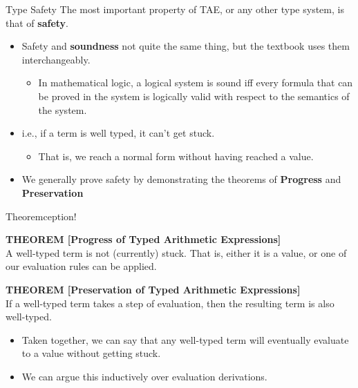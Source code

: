 \documentclass[11pt]{beamer}
\begin{document}
\begin{frame}[fragile=singleslide]{Type Safety}
The most important property of TAE, or any other type system, is that of \textbf{safety}.
\begin{itemize}
\item Safety and \textbf{soundness} not quite the same thing, but the textbook uses them interchangeably.  
\begin{itemize}
 \item In mathematical logic, a logical system is sound iff every formula that can be proved in the system is logically valid with respect to the semantics of the system.  
 \end{itemize} 
\item i.e., if a term is well typed, it can't get stuck. 
\begin{itemize}
\item That is, we reach a normal form without having reached a value.  
\end{itemize}
\item We generally prove safety by demonstrating the theorems of \textbf{Progress} and \textbf{Preservation}
\end{itemize}  

\end{frame}

\begin{frame}[fragile=singleslide]{Theoremception!}

\textbf{THEOREM [Progress of Typed Arithmetic Expressions]} \\

A well-typed term is not (currently) stuck.  That is, either it is a value, or one of our evaluation rules can be applied.  \\

\vspace{1em}

\textbf{THEOREM [Preservation of Typed Arithmetic Expressions]} \\

If a well-typed term takes a step of evaluation, then the resulting term is also well-typed.  \\

\vspace{1em}

\begin{itemize}
\item Taken together, we can say that any well-typed term will eventually evaluate to a value without getting stuck.
\item We can argue this inductively over evaluation derivations.
\end{itemize}
\end{frame}
\end{document}

